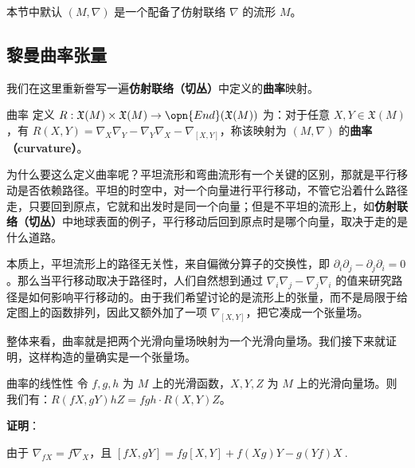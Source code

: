 

本节中默认 $(M, \nabla)$ 是一个配备了仿射联络 $\nabla$ 的流形 $M$。

\subsection{黎曼曲率张量}

我们在这里重新誊写一遍\textbf{仿射联络（切丛）}中定义的\textbf{曲率}映射。

\begin{definition}{曲率}
定义 $R:\mathfrak{X}(M)\times\mathfrak{X}(M)\to\opn{End}(\mathfrak{X}(M))$ 为：对于任意 $X, Y\in\mathfrak{X}(M)$，有 $R(X, Y)=\nabla_X\nabla_Y-\nabla_Y\nabla_X-\nabla_{[X, Y]}$，称该映射为 $(M, \nabla)$ 的\textbf{曲率（curvature）}。
\end{definition}

为什么要这么定义曲率呢？平坦流形和弯曲流形有一个关键的区别，那就是平行移动是否依赖路径。平坦的时空中，对一个向量进行平行移动，不管它沿着什么路径走，只要回到原点，它就和出发时是同一个向量；但是不平坦的流形上，如\textbf{仿射联络（切丛）}中地球表面的例子，平行移动后回到原点时是哪个向量，取决于走的是什么道路。

本质上，平坦流形上的路径无关性，来自偏微分算子的交换性，即 $\partial_i\partial_j-\partial_j\partial_i=0$。那么当平行移动取决于路径时，人们自然想到通过 $\nabla_i\nabla_j-\nabla_j\nabla_i$ 的值来研究路径是如何影响平行移动的。由于我们希望讨论的是流形上的张量，而不是局限于给定图上的函数排列，因此又额外加了一项 $\nabla_{[X, Y]}$，把它凑成一个张量场。

整体来看，曲率就是把两个光滑向量场映射为一个光滑向量场。我们接下来就证明，这样构造的量确实是一个张量场。

\begin{theorem}{曲率的线性性}\label{the_RicciC_1}
令 $f, g, h$ 为 $M$ 上的光滑函数，$X, Y, Z$ 为 $M$ 上的光滑向量场。则我们有：$R(fX, gY)hZ=fgh\cdot R(X, Y)Z$。
\end{theorem}

\textbf{证明}：

由于 $\nabla_{fX}=f\nabla_X$，且 $[fX, gY]=fg[X, Y]+f(Xg)Y-g(Yf)X~.$

